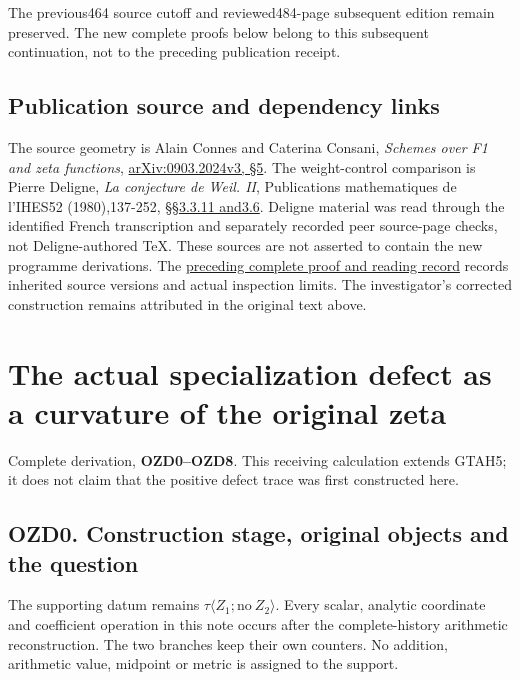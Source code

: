 The previous464 source cutoff and reviewed484-page subsequent edition
remain preserved. The new complete proofs below belong to this
subsequent continuation, not to the preceding publication receipt.

\section{Publication source and dependency
links}\label{publication-source-and-dependency-links-4}

The source geometry is Alain Connes and Caterina Consani, \emph{Schemes
over F1 and zeta functions},
\href{https://arxiv.org/abs/0903.2024v3}{arXiv:0903.2024v3, §5}. The
weight-control comparison is Pierre Deligne, \emph{La conjecture de
Weil. II}, Publications mathematiques de l'IHES52 (1980),137-252,
\href{https://www.numdam.org/item/PMIHES_1980__52__137_0/}{§§3.3.11
and3.6}. Deligne material was read through the identified French
transcription and separately recorded peer source-page checks, not
Deligne-authored TeX. These sources are not asserted to contain the new
programme derivations. The
\href{https://github.com/KokunoYumeto/zeta-function-research-reader/blob/36a82ecca98addb8a98b48204e349737856c7223/workbenches/splitzero-tandem/continuations/20260924-cohomology-weight-and-character-lifts/BUILD_AND_REVIEW.md}{preceding
complete proof and reading record} records inherited source versions and
actual inspection limits. The investigator's corrected construction
remains attributed in the original text above.

\chapter{The actual specialization defect as a curvature of the original
zeta}\label{the-actual-specialization-defect-as-a-curvature-of-the-original-zeta}

Complete derivation, \textbf{OZD0--OZD8}. This receiving calculation
extends GTAH5; it does not claim that the positive defect trace was
first constructed here.

\section{OZD0. Construction stage, original objects and the
question}\label{ozd0.-construction-stage-original-objects-and-the-question}

The supporting datum remains
\(\tau\langle Z_1;\mathrm{no}\ Z_2\rangle\). Every scalar, analytic
coordinate and coefficient operation in this note occurs after the
complete-history arithmetic reconstruction. The two branches keep their
own counters. No addition, arithmetic value, midpoint or metric is
assigned to the support.


